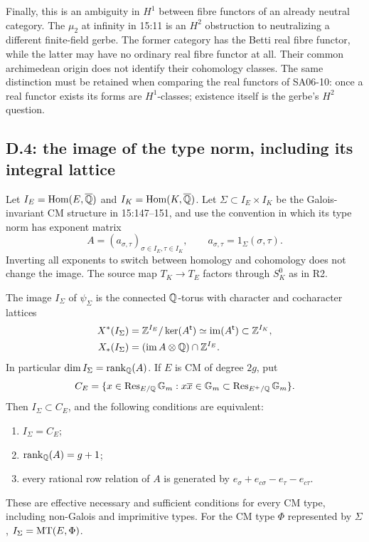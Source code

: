Finally, this is an ambiguity in $H^1$ between fibre functors of an
already neutral category.  The $\mu_2$ at infinity in 15:11 is an
$H^2$ obstruction to neutralizing a different finite-field gerbe.
The former category has the Betti real fibre functor, while the
latter may have no ordinary real fibre functor at all.  Their common
archimedean origin does not identify their cohomology classes.  The
same distinction must be retained when comparing the real functors
of SA06-10: once a real functor exists its forms are $H^1$-classes;
existence itself is the gerbe's $H^2$ question.

\subsection{D.4: the image of the type norm, including its integral lattice}
\label{subsec:d4}

Let $I_E=\operatorname{Hom}(E,\overline{\mathbb Q})$ and
$I_K=\operatorname{Hom}(K,\overline{\mathbb Q})$.  Let $\Sigma\subset I_E\times I_K$
be the Galois-invariant CM structure in 15:147--151, and use the
convention in which its type norm has exponent matrix
\[
 A=(a_{\sigma,\tau})_{\sigma\in I_E,\tau\in I_K},
 \qquad a_{\sigma,\tau}=1_\Sigma(\sigma,\tau).
\]
Inverting all exponents to switch between homology and cohomology
does not change the image.  The source map $T_K\to T_E$ factors
through $S_K^0$ as in R2.

\begin{theorem}
\label{thm:d-reflex-image}
The image $I_\Sigma$ of $\psi_\Sigma$ is the connected $\mathbb Q$-torus
with character and cocharacter lattices
\begin{align*}
 X^*(I_\Sigma)&=\mathbb Z^{I_E}/\ker(A^{\mathsf t})
                  \simeq\operatorname{im}(A^{\mathsf t})\subset\mathbb Z^{I_K},\\
 X_*(I_\Sigma)&=(\operatorname{im} A\otimes\mathbb Q)\cap\mathbb Z^{I_E}.
\end{align*}
In particular $\dim I_\Sigma=\operatorname{rank}_\mathbb Q(A)$.
If $E$ is CM of degree $2g$, put
\[
 C_E=\{x\in\operatorname{Res}_{E/\mathbb Q}{\mathbb G_m}:
              x\overline x\in{\mathbb G_m}\subset\operatorname{Res}_{E^+/\mathbb Q}{\mathbb G_m}\}.
\]
Then $I_\Sigma\subset C_E$, and the following conditions are equivalent:
\begin{enumerate}[label=(\roman*)]
 \item $I_\Sigma=C_E$;
 \item $\operatorname{rank}_\mathbb Q(A)=g+1$;
 \item every rational row relation of $A$ is generated by
 $e_\sigma+e_{c\sigma}-e_\tau-e_{c\tau}$.
\end{enumerate}
These are effective necessary and sufficient conditions for every CM
type, including non-Galois and imprimitive types.  For the CM type
$\Phi$ represented by $\Sigma$, $I_\Sigma=\operatorname{MT}(E,\Phi)$.
\end{theorem}

